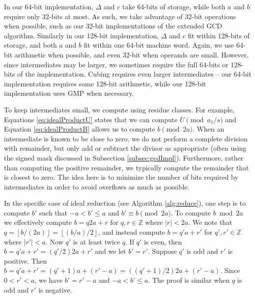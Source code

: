 \documentclass{ucalgthes1}
\theoremstyle{definition}
\newcommand{\ZZ}{\mathbb{Z}}
\newcommand{\floor}[1]{\left\lfloor #1 \right\rfloor}
\begin{document}
In our 64-bit implementation, $\Delta$ and $c$ take 64-bits of storage, while both $a$ and $b$ require only 32-bits at most.  As such, we take advantage of 32-bit operations when possible, such as our 32-bit implementations of the extended GCD algorithm.  Similarly in our 128-bit implementation, $\Delta$ and $c$ fit within 128-bits of storage, and both $a$ and $b$ fit within one 64-bit machine word.  Again, we use 64-bit arithmetic when possible, and even 32-bit when operands are small.  However, since intermediates may be larger, we sometimes require the full 64-bits or 128-bits of the implementation.  Cubing requires even larger intermediates -- our 64-bit implementation requires some 128-bit arithmetic, while our 128-bit implementation uses GMP when necessary.

To keep intermediates small, we compute using residue classes.  For example, Equations \ref{eq:idealProductU} states that we can compute $U \pmod {a_1/s}$ and Equation \ref{eq:idealProductB} allows us to compute $b \pmod{2a}$.  When an intermediate is known to be close to zero, we do not perform a complete division with remainder, but only add or subtract the divisor as appropriate (often using the signed mask discussed in Subsection \ref{subsec:gcdImpl}).  Furthermore, rather than computing the positive remainder, we typically compute the remainder that is closest to zero.  The idea here is to minimize the number of bits required by intermediates in order to avoid overflows as much as possible.

In the specific case of ideal reduction (see Algorithm \ref{alg:reduce}), one step is to compute $b'$ such that $-a < b' \le a$ and $b' \equiv b \pmod{2a}$.  To compute $b \bmod{2a}$ we effectively compute $b = q2a + r$ for $q, r \in \ZZ$ where $|r| < 2a$.  We note that $q = \floor{b/(2a)} = \floor{(b/a)/2}$, and instead compute $b = q'a+r'$ for $q', r' \in \ZZ$ where $|r'| < a$.  Now $q'$ is at least twice $q$.  If $q'$ is even, then $b = q'a + r' = (q'/2)2a + r'$ and we let $b' = r'$. Suppose $q'$ is odd and $r'$ is positive.  Then $b = q'a + r' = (q' + 1)a + (r' - a) = ((q' + 1)/2)2a + (r' - a)$.  Since $0 < r' < a$, we have $b' = r' - a$ and $-a < b' \le a$.  The proof is similar when $q$ is odd and $r'$ is negative.
\end{document}
